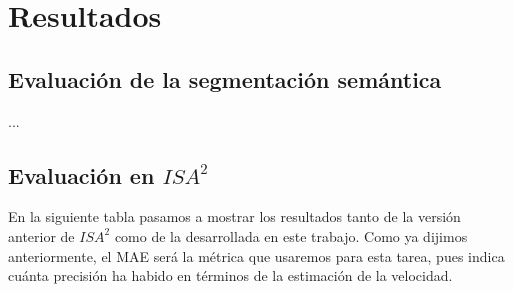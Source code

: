 \chapter{Resultados}



\section{Evaluación de la segmentación semántica}
...
\section{Evaluación en $ISA^2$}


En la siguiente tabla pasamos a mostrar los resultados tanto de la versión anterior de $ISA^{2}$ \cite{xxxx} como de la desarrollada en este trabajo. Como ya dijimos anteriormente, el \ac{MAE} será la métrica que usaremos para esta tarea, pues indica cuánta precisión ha habido en términos de la estimación de la velocidad.



